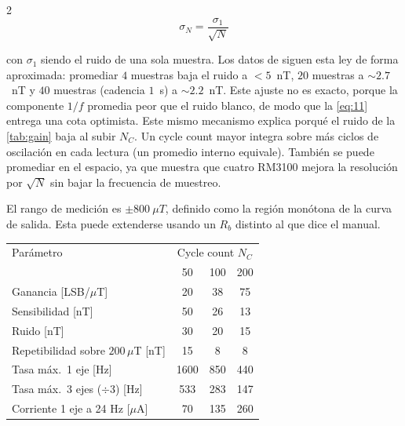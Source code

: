\documentclass[11pt,letterpaper]{article}
\begin{document}
\begin{multicols*}{2}
\begin{equation}
    \sigma_N = \dfrac{\sigma_1}{\sqrt{N}}
        \label{eq:11}
\end{equation}

con $\sigma_1$ siendo el ruido de una sola muestra. Los datos de \citet{regoli2018} siguen esta ley de forma aproximada: promediar $4$ muestras baja el ruido a $<5$~nT, $20$ muestras a $\sim\!2.7$~nT y $40$ muestras (cadencia $1$~s) a $\sim\!2.2$~nT. Este ajuste no es exacto, porque la componente $1/f$ promedia peor que el ruido blanco, de modo que la \cref{eq:11} entrega una cota optimista. Este mismo mecanismo explica porqué el ruido de la \cref{tab:gain} baja al subir $N_C$. Un cycle count mayor integra sobre más ciclos de oscilación en cada lectura (un promedio interno equivale). También se puede promediar en el espacio, ya que \citet{regoli2018} muestra que cuatro RM3100 mejora la resolución por $\sqrt{N}$ sin bajar la frecuencia de muestreo.

El rango de medición es $\pm\!800\ \mu T$, definido como la región monótona de la curva de salida. Esta puede extenderse usando un $R_b$ distinto al que dice el manual.

\begin{center}
    \label{tab:gain}
    \small
    \setlength{\tabcolsep}{4pt}
    \begin{tabular}{@{}lccc@{}}
        \hline
        Par\'ametro & \multicolumn{3}{c}{Cycle count $N_C$} \\
                    & 50 & 100 & 200 \\
        \hline
        Ganancia [LSB/$\mu$T]              & 20   & 38  & 75  \\
        Sensibilidad [nT]                  & 50   & 26  & 13  \\
        Ruido [nT]                         & 30   & 20  & 15  \\
        Repetibilidad sobre $200\,\mu$T [nT] & 15 & 8   & 8   \\
        Tasa máx.\ 1 eje [Hz]            & 1600 & 850 & 440 \\
        Tasa máx.\ 3 ejes ($\div3$) [Hz] & 533 & 283 & 147 \\
        Corriente 1 eje a 24 Hz [$\mu$A]    & 70   & 135 & 260 \\
        \hline
    \end{tabular}
\end{center}


\end{multicols*}
\end{document}
